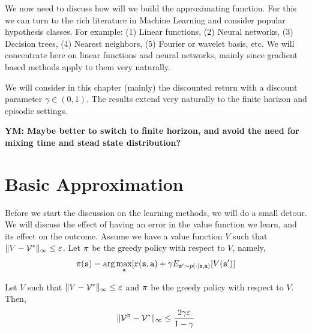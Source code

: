 We now need to discuss how will we build the approximating function.
For this we can turn to the rich literature in Machine Learning and
consider popular hypothesis classes. For example: (1) Linear
functions, (2) Neural networks, (3) Decision trees, (4) Nearest
neighbors, (5) Fourier or wavelet basis, etc. We will concentrate
here on linear functions and neural networks, mainly since gradient
based methods apply to them very naturally.

We will consider in this chapter (mainly) the discounted return with
a discount parameter $\gamma\in(0,1)$. The results extend very
naturally to the finite horizon and episodic settings.

\textbf{YM: Maybe better to switch to finite horizon, and avoid the
need for mixing time and stead state distribution?}

\section{Basic Approximation}

Before we start the discussion on the learning methods, we will do a
small detour. We will discuss the effect of having an error in the
value function we learn, and its effect on the outcome. Assume we
have a value function $V$ such that $\|V-\mathcal{V}^*\|_\infty\leq
\varepsilon$. Let $\pi$ be the greedy policy with respect to
$V$, namely,
\[
\pi({\tt s})=\arg\max_{\tt a} [{\tt r}({\tt s},{\tt a})+\gamma
E_{{\tt s}'\sim p(\cdot|{\tt s},{\tt a})}[V({\tt s}')]
\]


\begin{theorem}
Let $V$ such that $\|V-\mathcal{V}^*\|_\infty\leq \varepsilon$ and
$\pi$ be the greedy policy with respect to $V$. Then,
\[
\|\mathcal{V}^\pi-\mathcal{V}^*\|_\infty\leq\frac{2\gamma\varepsilon}{1-\gamma}
\]
\end{theorem}

